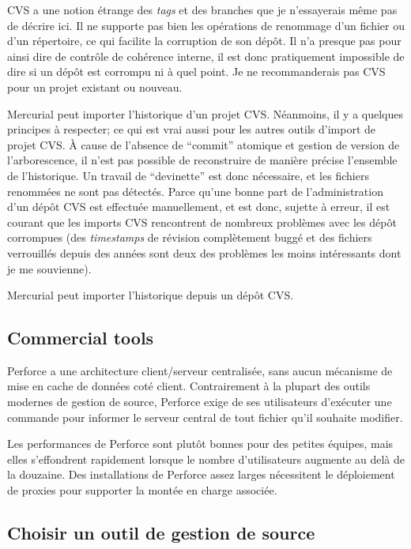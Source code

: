 CVS a une notion étrange des \textit{tags} et des branches que je n'essayerais
même pas de décrire ici. Il ne supporte pas bien les opérations de renommage d'un 
fichier ou d'un répertoire, ce qui facilite la corruption de son dépôt. Il n'a
presque pas pour ainsi dire de contrôle de cohérence interne, il est donc 
pratiquement impossible de dire si un dépôt est corrompu ni à quel point. Je
ne recommanderais pas CVS pour un projet existant ou nouveau.

Mercurial peut importer l'historique d'un projet CVS. Néanmoins, il y a 
quelques principes à respecter; ce qui est vrai aussi pour les autres
outils d'import de projet CVS. À cause de l'absence de ``commit'' atomique
et gestion de version de l'arborescence, il n'est pas possible de reconstruire
de manière précise l'ensemble de l'historique. Un travail de ``devinette''
est donc nécessaire, et les fichiers renommées ne sont pas détectés. Parce 
qu'une bonne part de l'administration d'un dépôt CVS est effectuée manuellement, 
et est donc, sujette à erreur, il est courant que les imports CVS rencontrent 
de nombreux problèmes avec les dépôt corrompues (des \textit{timestamps} 
de révision complètement buggé et des fichiers verrouillés depuis des années 
sont deux des problèmes les moins intéressants dont je me souvienne).

Mercurial peut importer l'historique depuis un dépôt CVS.

\subsection{Commercial tools}

Perforce a une architecture client/serveur centralisée, sans aucun
mécanisme de mise en cache de données coté client. Contrairement à la plupart
des outils modernes de gestion de source, Perforce exige de ses 
utilisateurs d'exécuter une commande pour informer le serveur
central de tout fichier qu'il souhaite modifier.

Les performances de Perforce sont plutôt bonnes pour des petites
équipes, mais elles s'effondrent rapidement lorsque le nombre 
d'utilisateurs augmente au delà de la douzaine. Des installations 
de Perforce assez larges nécessitent le déploiement de proxies pour 
supporter la montée en charge associée.

\subsection{Choisir un outil de gestion de source}

